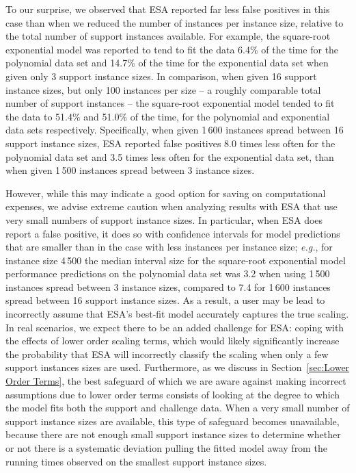 \documentclass[aic]{iosart2x}
\newcommand{\eg}{\emph{e.g.}}
\begin{document}
To our surprise, we observed that ESA reported far less false positives in this case than when we reduced the number of instances per instance size, relative to the total number of support instances available. 
For example, the square-root exponential model was reported to tend to fit the data 6.4\% of the time for the polynomial data set and 14.7\% of the time for the exponential data set when given only 3 support instance sizes. In comparison, when given 16 support instance sizes, but only 100 instances per size -- a roughly comparable total number of support instances -- the square-root exponential model tended to fit the data to 51.4\% and 51.0\% of the time, for the polynomial and exponential data sets respectively.
Specifically, when given 1\,600 instances spread between 16 support instance sizes, ESA reported false positives 8.0 times less often for the polynomial data set and 3.5 times less often for the exponential data set, than when given 1\,500 instances spread between 3 instance sizes. 

However, while this may indicate a good option for saving on computational expenses, we advise extreme caution when analyzing results with ESA that use very small numbers of support instance sizes. 
In particular, when ESA does report a false positive, it does so with confidence intervals for model predictions that are smaller than in the case with less instances per instance size; \eg{}, for instance size 4\,500 the median interval size for the square-root exponential model performance predictions on the polynomial data set was 3.2 when using 1\,500 instances spread between 3 instance sizes, compared to 7.4 for 1\,600 instances spread between 16 support instance sizes. 
As a result, a user may be lead to incorrectly assume that ESA's best-fit model accurately captures the true scaling. 
In real scenarios, we expect there to be an added challenge for ESA: coping with the effects of lower order scaling terms, which would likely significantly increase the probability that ESA will incorrectly classify the scaling when only a few support instances sizes are used. 
Furthermore, as we discuss in Section~\ref{sec:Lower Order Terms}, the best safeguard of which we are aware against making incorrect assumptions due to lower order terms consists of looking at the degree to which the model fits both the support and challenge data. When a very small number of support instance sizes are available, this type of safeguard becomes unavailable, because there are not enough small support instance sizes to determine whether or not there is a systematic deviation pulling the fitted model away from the running times observed on the smallest support instance sizes.
\end{document}
